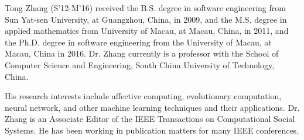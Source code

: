 \documentclass[lettersize,journal]{IEEEtran}
\begin{document}
\begin{IEEEbiography}{Tong Zhang}
	(S'12-M'16) received the B.S. degree in software engineering from Sun Yat-sen University, at Guangzhou, China, in 2009, and the M.S. degree in applied mathematics from University of Macau, at Macau, China, in 2011, and the Ph.D. degree in software engineering from the University of Macau, at Macau, China in 2016. Dr. Zhang currently is a professor with the School of Computer Science and Engineering, South China University of Technology, China.
	
	His research interests include affective computing, evolutionary computation, neural network, and other machine learning techniques and their applications. Dr. Zhang is an Associate Editor of the IEEE Transactions on Computational Social Systems. He has been working in publication matters for many IEEE conferences.
\end{IEEEbiography}
\end{document}
